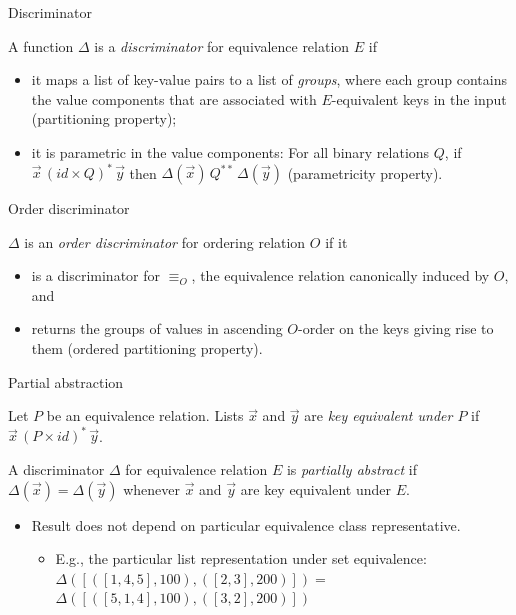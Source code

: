 \documentclass{beamer}
\begin{document}
\begin{frame}{Discriminator}
  \begin{definition}[Discriminator]
    A function $\Delta$ is a \emph{discriminator} for equivalence relation $E$
    if
    \begin{itemize}
    \item it maps a list of key-value pairs to a list of \emph{groups}, where
      each group contains the value components that are associated with
      $E$-equivalent keys in the input (partitioning property);
    \item it is parametric in the value components: For all binary relations
      $Q$, if $\vec{x}\,(id \times Q)^*\,\vec{y}$ then
      $\Delta(\vec{x})\,Q^{**}\,\Delta(\vec{y})$ (parametricity property).
    \end{itemize}
  \end{definition}
\end{frame}

\begin{frame}{Order discriminator}
  \begin{definition}
    $\Delta$ is an \emph{order discriminator} for ordering relation $O$ if it
    \begin{itemize}
    \item is a discriminator for $\equiv_O$, the equivalence relation
      canonically induced by $O$, and
    \item returns the groups of values in ascending $O$-order on the keys
      giving rise to them (ordered partitioning property).
    \end{itemize}
  \end{definition}
\end{frame}

\begin{frame}{Partial abstraction}
  \begin{definition}
    Let $P$ be an equivalence relation. Lists $\vec{x}$ and $\vec{y}$ are
    \emph{key equivalent under $P$} if $\vec{x}\,(P \times id)^*\,\vec{y}$.
  \end{definition}
  \begin{definition}
    A discriminator $\Delta$ for equivalence relation $E$ is \emph{partially
      abstract} if $\Delta(\vec{x}) = \Delta(\vec{y})$ whenever $\vec{x}$ and
    $\vec{y}$ are key equivalent under $E$.
  \end{definition}
  \begin{itemize}
  \item Result does not depend on particular equivalence class
    representative.
    \begin{itemize}
    \item E.g., the particular list representation under set equivalence:
      $\Delta([([1, 4, 5], 100), ([2, 3], 200)]) =$\\
      $\Delta([([5, 1, 4], 100), ([3, 2], 200)])$
    \end{itemize}
  \end{itemize}
\end{frame}
\end{document}
